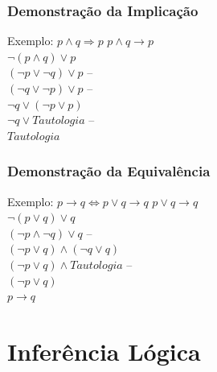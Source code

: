\documentclass{beamer}
\begin{document}
\begin{frame}
\frametitle{Demonstração da Implicação}

\begin{exampleblock}{Exemplo: $p \wedge q \Rightarrow p$}
$p \wedge  q \rightarrow p$\\
$\neg (p \wedge q) \vee p$\\
$(\neg p \vee \neg q) \vee p$ -- \\
$(\neg q \vee \neg p) \vee p$ -- \\
$\neg q \vee (\neg p \vee p)$\\
$\neg q \vee Tautologia$  -- \\
$Tautologia$ \\
\end{exampleblock}
\end{frame}

\begin{frame}
\frametitle{Demonstração da Equivalência}

\begin{exampleblock}{Exemplo: $p \rightarrow q \Leftrightarrow p \vee q \rightarrow q$}
$p \vee q \rightarrow q$\\
$\neg (p \vee q) \vee q$\\
$(\neg p \wedge \neg q) \vee q$ -- \\
$(\neg p \vee q) \wedge (\neg q \vee q)$\\
$(\neg p \vee q) \wedge Tautologia$ -- \\
$(\neg p \vee q)$\\
$p \rightarrow q$
\end{exampleblock}
\end{frame}

\section{Inferência Lógica}
\end{document}
